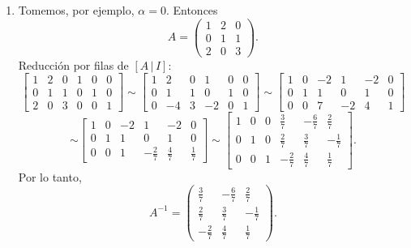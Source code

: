\documentclass[11pt,respuestas,a4]{aleph-examen}
\begin{document}
\begin{preguntas}
\begin{respuesta}
\begin{enumerate}
    \item Tomemos, por ejemplo, \(\alpha=0\). Entonces
    \[
        A=\begin{pmatrix}
            1 & 2 & 0 \\
            0 & 1 & 1 \\
            2 & 0 & 3
        \end{pmatrix}.
    \]
    Reducción por filas de \([A\,|\,I]\):
    \[
        \left[\begin{array}{ccc|ccc}
            1 & 2 & 0 & 1 & 0 & 0 \\
            0 & 1 & 1 & 0 & 1 & 0 \\
            2 & 0 & 3 & 0 & 0 & 1
        \end{array}\right]
        \sim
        \left[\begin{array}{ccc|ccc}
            1 & 2 & 0 & 1 & 0 & 0 \\
            0 & 1 & 1 & 0 & 1 & 0 \\
            0 & -4 & 3 & -2 & 0 & 1
        \end{array}\right]
        \sim
        \left[\begin{array}{ccc|ccc}
            1 & 0 & -2 & 1 & -2 & 0 \\
            0 & 1 & 1 & 0 & 1 & 0 \\
            0 & 0 & 7 & -2 & 4 & 1
        \end{array}\right]
    \]
    \[
        \sim
        \left[\begin{array}{ccc|ccc}
            1 & 0 & -2 & 1 & -2 & 0 \\
            0 & 1 & 1 & 0 & 1 & 0 \\
            0 & 0 & 1 & -\frac27 & \frac47 & \frac17
        \end{array}\right]
        \sim
        \left[\begin{array}{ccc|ccc}
            1 & 0 & 0 & \frac37 & -\frac67 & \frac27 \\
            0 & 1 & 0 & \frac27 & \frac37 & -\frac17 \\
            0 & 0 & 1 & -\frac27 & \frac47 & \frac17
        \end{array}\right].
    \]
    Por lo tanto,
    \[
        A^{-1}=\begin{pmatrix}
            \frac37 & -\frac67 & \frac27 \\
            \frac27 & \frac37 & -\frac17 \\
            -\frac27 & \frac47 & \frac17
        \end{pmatrix}.
    \]
\end{enumerate}
\end{respuesta}


\end{preguntas}
\end{document}
